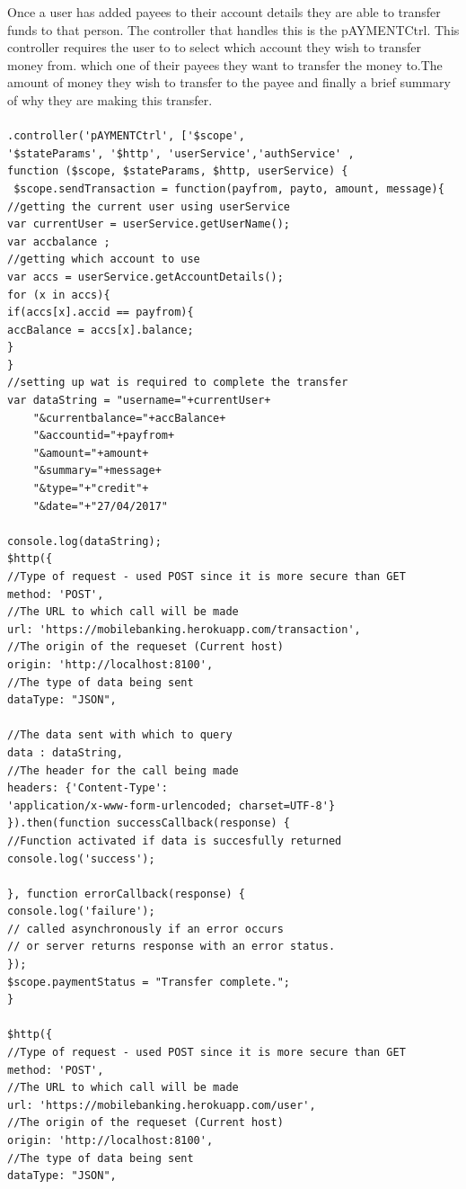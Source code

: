 Once a user has added payees to their account details they are able to transfer funds to that person. The controller that handles this is the pAYMENTCtrl. This controller requires the user to to select which account they wish to transfer money from. which one of their payees they want to transfer the money to.The amount of money they wish to transfer to the payee and finally a brief summary of why they are making this transfer.\paragraph{}
\begin{verbatim}
.controller('pAYMENTCtrl', ['$scope',
'$stateParams', '$http', 'userService','authService' ,
function ($scope, $stateParams, $http, userService) {
 $scope.sendTransaction = function(payfrom, payto, amount, message){
//getting the current user using userService
var currentUser = userService.getUserName();
var accbalance ;
//getting which account to use
var accs = userService.getAccountDetails();
for (x in accs){
if(accs[x].accid == payfrom){
accBalance = accs[x].balance;
}
}
//setting up wat is required to complete the transfer
var dataString = "username="+currentUser+
    "&currentbalance="+accBalance+
    "&accountid="+payfrom+
    "&amount="+amount+
    "&summary="+message+
    "&type="+"credit"+
    "&date="+"27/04/2017"

console.log(dataString);
$http({
//Type of request - used POST since it is more secure than GET
method: 'POST',
//The URL to which call will be made
url: 'https://mobilebanking.herokuapp.com/transaction',
//The origin of the requeset (Current host)
origin: 'http://localhost:8100',
//The type of data being sent
dataType: "JSON",

//The data sent with which to query
data : dataString,
//The header for the call being made
headers: {'Content-Type':
'application/x-www-form-urlencoded; charset=UTF-8'}
}).then(function successCallback(response) {
//Function activated if data is succesfully returned
console.log('success');

}, function errorCallback(response) {
console.log('failure');
// called asynchronously if an error occurs
// or server returns response with an error status.
});
$scope.paymentStatus = "Transfer complete.";
}

$http({
//Type of request - used POST since it is more secure than GET
method: 'POST',
//The URL to which call will be made
url: 'https://mobilebanking.herokuapp.com/user',
//The origin of the requeset (Current host)
origin: 'http://localhost:8100',
//The type of data being sent
dataType: "JSON",


\end{verbatim}

